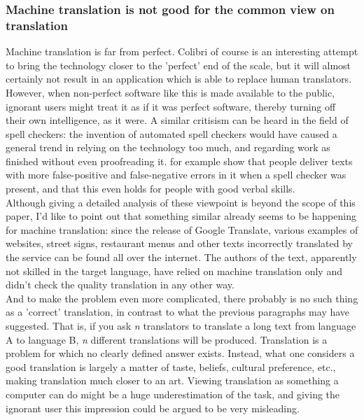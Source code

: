 \documentclass[12pt]{article}
\begin{document}

\subsubsection{Machine translation is not good for the common view on translation}

Machine translation is far from perfect. Colibri of course is an interesting attempt to bring the technology closer to the 'perfect' end of the scale, but it will almost certainly not result in an application which is able to replace human translators. However, when non-perfect software like this is made available to the public, ignorant users might treat it as if it was perfect software, thereby turning off their own intelligence, as it were. A similar critisism can be heard in the field of spell checkers: the invention of automated  spell checkers would have caused a general trend in relying on the technology too much, and regarding work as finished without even proofreading it. \citet{galletta05} for example show that people deliver texts with more false-positive and false-negative errors in it when a spell checker was present, and that this even holds for people with good verbal skills. \\\indent
Although giving a detailed analysis of these viewpoint is beyond the scope of this paper, I'd like to point out that something similar already seems to be happening for machine translation: since the release of Google Translate, various examples of websites, street signs, restaurant menus and other texts incorrectly translated by the service can be found all over the internet. The authors of the text, apparently not skilled in the target language, have relied on machine translation only and didn't check the quality translation in any other way.\\\indent
And to make the problem even more complicated, there probably is no such thing as a 'correct' translation, in contrast to what the previous paragraphs may have suggested. That is, if you ask \emph{n} translators to translate a long text from language A to language B, \emph{n} different translations will be produced. Translation is a problem for which no clearly defined answer exists. Instead, what one considers a good translation is largely a matter of taste, beliefs, cultural preference, etc., making translation much closer to an art. Viewing translation as something a computer can do might be a huge underestimation of the task, and giving the ignorant user this impression could be argued to be very misleading.
\end{document}
